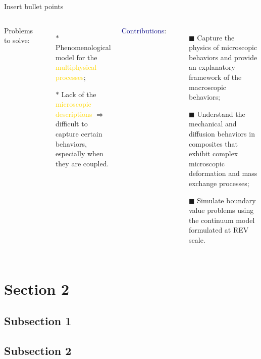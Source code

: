 \documentclass[hyperref={bookmarks=false},aspectratio=169]{beamer}
\begin{document}

\begin{frame}{Insert bullet points}
\begin{columns}
\textcolor{myblue}{Problems to solve}:
\begin{enumerate}
    \item[$\ast$] Phenomenological model for the \textcolor{Gold}{multiphysical processes};
    
    \item[$\ast$] Lack of the \textcolor{Gold}{microscopic descriptions} $\Rightarrow$ difficult to capture certain behaviors, especially when they are coupled.
\end{enumerate}

\textcolor{Navy}{Contributions}:
\begin{enumerate}
    \item[$\blacksquare$] Capture the physics of \textcolor{myred}{microscopic behaviors} and provide an explanatory framework of the \textcolor{myred}{macroscopic behaviors}; 
    
    \item[$\blacksquare$] Understand the \textcolor{myred}{mechanical and diffusion behaviors} in composites that exhibit complex \textcolor{myred}{microscopic deformation and mass exchange processes};
    
    \item[$\blacksquare$] Simulate \textcolor{myred}{boundary value problems} using the continuum model formulated at REV scale. 
\end{enumerate}
\end{columns}
\end{frame}


\section{Section 2}


\subsection{Subsection 1}


\subsection{Subsection 2}







   
\end{document}
